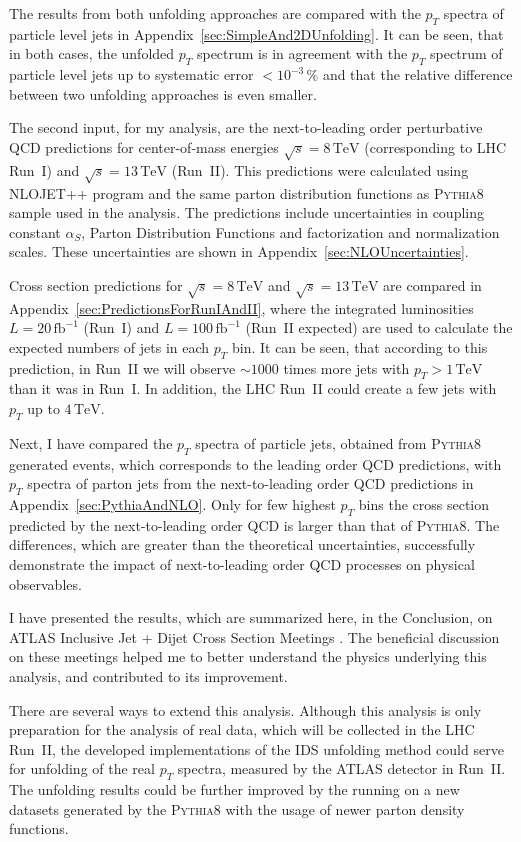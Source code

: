 \documentclass[a4paper,11pt,twoside,openright]{book}
\newcommand{\TeV}{\,\text{TeV}}
\newcommand{\pt}{p_{T}}
\begin{document}
The results from both unfolding approaches are compared with the $\pt$
spectra of particle level jets in Appendix~\ref{sec:SimpleAnd2DUnfolding}. It
can be seen, that in both cases, the unfolded $\pt$ spectrum is in agreement
with the $\pt$ spectrum of particle level jets up to systematic error $<
10^{-3}\,\%$ and that the relative difference between two unfolding approaches
is even smaller.

The second input, for my analysis, are the next-to-leading order perturbative QCD
predictions for center-of-mass energies $\sqrt{s}=8\TeV$ (corresponding to LHC Run~I)
and $\sqrt{s}=13\TeV$ (Run~II). This predictions were calculated 
using \textsc{NLOJET++} program and the same parton distribution functions as
\textsc{Pythia8} sample used in the analysis. The predictions
include uncertainties in coupling constant $\alpha_S$, Parton Distribution
Functions and factorization and normalization scales. These uncertainties are
shown in Appendix~\ref{sec:NLOUncertainties}.

Cross section predictions for $\sqrt{s}=8\TeV$ and $\sqrt{s}=13\TeV$ are
compared in Appendix~\ref{sec:PredictionsForRunIAndII}, where the
integrated luminosities $L=20\,\text{fb}^{-1}$ (Run~I) and
$L=100\,\text{fb}^{-1}$ (Run~II expected) are used to calculate the expected
numbers of jets in each $\pt$ bin. It
can be seen, that according to
this prediction, in Run~II we will observe $\sim 1000$ times more jets with $\pt > 1\TeV$
than it was in Run~I. In addition, the LHC Run~II could create a few jets
with $\pt$ up to $4\TeV$.

Next, I have compared the $\pt$ spectra of particle jets, obtained from
\textsc{Pythia8} generated events, which corresponds to the leading order QCD
predictions, with $\pt$ spectra of parton jets from the next-to-leading order
QCD predictions in
Appendix~\ref{sec:PythiaAndNLO}. Only for few highest $\pt$ bins the cross section
predicted by the next-to-leading order QCD is larger than that of
\textsc{Pythia8}. The differences, which are greater than the
theoretical uncertainties, successfully demonstrate the impact of
next-to-leading order QCD processes on physical observables.

I have presented the results, which are summarized here, in the Conclusion, on
ATLAS Inclusive Jet + Dijet Cross Section Meetings \cite{Prez1,Prez2}. The
beneficial discussion on these meetings helped me to better understand the
physics underlying this analysis, and contributed to its improvement.

There are several ways to extend this analysis. Although this analysis is only
preparation for the analysis of real data, which will be collected in the LHC Run~II,
the developed implementations of the IDS unfolding method could serve for
unfolding of the real $\pt$ spectra, measured by the ATLAS detector in Run~II.
The unfolding results could be further improved by the running on a new datasets
generated by the \textsc{Pythia8} with the usage of newer parton density
functions. 
\end{document}
